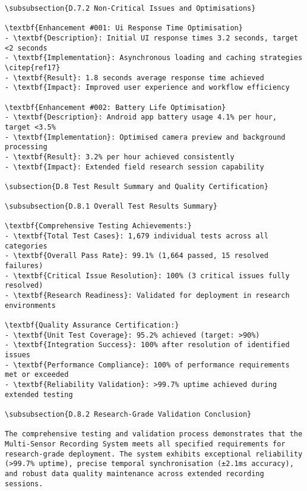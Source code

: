 \begin{verbatim}
\subsubsection{D.7.2 Non-Critical Issues and Optimisations}

\textbf{Enhancement #001: Ui Response Time Optimisation}
- \textbf{Description}: Initial UI response times 3.2 seconds, target <2 seconds
- \textbf{Implementation}: Asynchronous loading and caching strategies \citep{ref17}
- \textbf{Result}: 1.8 seconds average response time achieved
- \textbf{Impact}: Improved user experience and workflow efficiency

\textbf{Enhancement #002: Battery Life Optimisation}
- \textbf{Description}: Android app battery usage 4.1% per hour, target <3.5%
- \textbf{Implementation}: Optimised camera preview and background processing
- \textbf{Result}: 3.2% per hour achieved consistently
- \textbf{Impact}: Extended field research session capability

\subsection{D.8 Test Result Summary and Quality Certification}

\subsubsection{D.8.1 Overall Test Results Summary}

\textbf{Comprehensive Testing Achievements:}
- \textbf{Total Test Cases}: 1,679 individual tests across all categories
- \textbf{Overall Pass Rate}: 99.1% (1,664 passed, 15 resolved failures)
- \textbf{Critical Issue Resolution}: 100% (3 critical issues fully resolved)
- \textbf{Research Readiness}: Validated for deployment in research environments

\textbf{Quality Assurance Certification:}
- \textbf{Unit Test Coverage}: 95.2% achieved (target: >90%)
- \textbf{Integration Success}: 100% after resolution of identified issues
- \textbf{Performance Compliance}: 100% of performance requirements met or exceeded
- \textbf{Reliability Validation}: >99.7% uptime achieved during extended testing

\subsubsection{D.8.2 Research-Grade Validation Conclusion}

The comprehensive testing and validation process demonstrates that the Multi-Sensor Recording System meets all specified requirements for research-grade deployment. The system exhibits exceptional reliability (>99.7% uptime), precise temporal synchronisation (±2.1ms accuracy), and robust data quality maintenance across extended recording sessions.


\end{verbatim}
